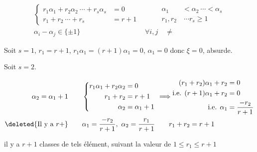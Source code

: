 \[
\begin{aligned}
\left\{\begin{aligned}
r_1\alpha_1+r_2\alpha_2\ \cdots+r_s\alpha_s&=0\\
r_1+r_2\ \cdots+r_s&=r+1
\end{aligned}\right.&\qquad
\begin{aligned}\alpha_1&<\alpha_2\ \cdots<\alpha_s\\r_1,r_2&\ \cdots r_s\geq1\end{aligned}\\
\alpha_i-\alpha_j\in\{\pm1\}\quad&\forall i,j\quad\ne
\end{aligned}
\]

Soit  $s=1$,  $r_1=r+1$, $r_1\alpha_1=(r+1)\alpha_1=0$, $\alpha_1=0$  donc $\xi=0$, absurde.

Soit $s=2$.

\[
\begin{aligned}
\alpha_2=\alpha_1+1\qquad&
\left\{\begin{aligned}
r_1\alpha_1+r_2\alpha_2&=0\\r_1+r_2&=r+1\\\alpha_2&=\alpha_1+1
\end{aligned}\right.
\ \Longrightarrow
\begin{aligned}
(r_1+r_2)\alpha_1+r_2&=0\\
\text{i.e. }(r+1)\alpha_1+r_2&=0\\
\text{i.e. }\alpha_1&=\frac{-r_2}{r+1}
\end{aligned}\\
\deleted{\text{Il y a }r+}\qquad&
\alpha_1=\frac{-r_2}{r+1},\ \alpha_2=\frac{r_1}{r+1}\qquad r_1+r_2=r+1
\end{aligned}
\]

il y a $r+1$ classes de tels élément, suivant la valeur de $1\leq r_1\leq r+1$

